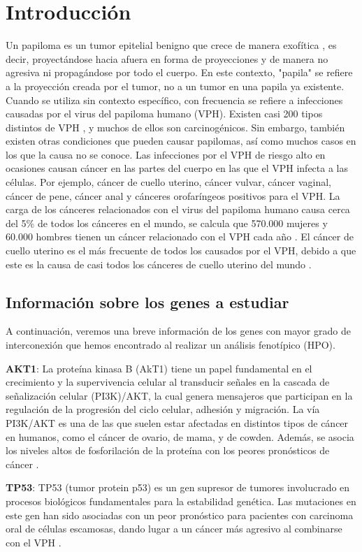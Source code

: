 \section{Introducción}
Un papiloma es un tumor epitelial benigno que crece de manera exofítica \cite{Kozomara2007}, es decir, proyectándose hacia afuera en forma de proyecciones y de manera no agresiva ni propagándose por todo el cuerpo. En este contexto, "papila" se refiere a la proyección creada por el tumor, no a un tumor en una papila ya existente.
Cuando se utiliza sin contexto específico, con frecuencia se refiere a infecciones causadas por el virus del papiloma humano (VPH). Existen casi 200 tipos distintos de VPH \cite{Ljubojevic2014}, y muchos de ellos son carcinogénicos. Sin embargo, también existen otras condiciones que pueden causar papilomas, así como muchos casos en los que la causa no se conoce.
Las infecciones por el VPH de riesgo alto en ocasiones causan cáncer en las partes del cuerpo en las que el VPH infecta a las células. Por ejemplo, cáncer de cuello uterino, cáncer vulvar, cáncer vaginal, cáncer de pene, cáncer anal y cánceres orofaríngeos positivos para el VPH. La carga de los cánceres relacionados con el virus del papiloma humano causa cerca del 5\% \cite{papiloma} de todos los cánceres en el mundo, se calcula que 570.000 mujeres y 60.000 hombres tienen un cáncer relacionado con el VPH cada año \cite{papiloma} . El cáncer de cuello uterino es el más frecuente de todos los causados por el VPH, debido a que este es la causa de casi todos los cánceres de cuello uterino del mundo \cite{papiloma}.

\vspace{5pt}

\subsection{Información sobre los genes a estudiar} 
A continuación, veremos una breve información de los genes con mayor grado de interconexión que hemos encontrado al realizar un análisis fenotípico (HPO).

\vspace{3pt}

\textbf{AKT1}: La proteína kinasa B (AkT1) tiene un papel fundamental en el crecimiento y la supervivencia celular al transducir señales en la cascada de señalización celular (PI3K)/AKT, la cual genera mensajeros que participan en la regulación de la progresión del ciclo celular, adhesión y migración. La vía  PI3K/AKT es una de las que suelen estar afectadas en distintos tipos de cáncer en humanos, como el cáncer de ovario, de mama, y de cowden. Además, se asocia los niveles altos de fosforilación de la proteína con los peores pronósticos de cáncer \cite{Siegel2012}.

\textbf{TP53}: TP53 (tumor protein p53) es un gen supresor de tumores involucrado en procesos biológicos fundamentales para la estabilidad genética. Las mutaciones en este gen han sido asociadas con un peor pronóstico para pacientes con carcinoma oral de células escamosas, dando lugar a un cáncer más agresivo al combinarse con el VPH \cite{McKenna2021}.
